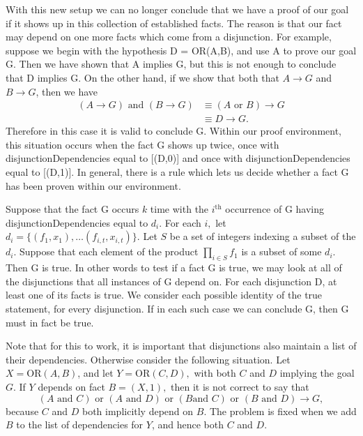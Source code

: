 \documentclass[11pt,
oneside]{article} %
\begin{document}
With this new setup we can no longer conclude that we have a proof of
our goal if it shows up in this collection of established facts.  The
reason is that our fact may depend on one more facts which come from a
disjunction.  For example, suppose we begin with the hypothesis D =
OR(A,B), and use A to prove our goal G.  Then we have shown that A
implies G, but this is not enough to conclude that D implies G.  On
the other hand, if we show that both that $A\longrightarrow G$ and
$B\longrightarrow G$, then we have
\begin{align*}
(A\longrightarrow G) \text{ and } (B \longrightarrow G) &\equiv (A \text{ or } B) \longrightarrow G \\
&\equiv D \longrightarrow G.
\end{align*} Therefore in this case it is valid to conclude G. Within our proof environment, this situation occurs when the fact G shows up twice, once with disjunctionDependencies equal to [(D,0)] and once with disjunctionDependencies equal to [(D,1)].  In general, there is a rule which lets us decide whether a fact G has been proven within our environment.

Suppose that the fact G occurs $k$ time with the $i^{\text{th}}$
occurrence of G having disjunctionDependencies equal to $d_i.$ For
each $i,$ let $d_i = \{(f_1,x_1), \ldots (f_{i,t}, x_{i,t})\}.$ Let
$S$ be a set of integers indexing a subset of the $d_i$. Suppose that
each element of the product $\prod_{i\in S} f_1$ is a subset of some
$d_i$.  Then G is true.  In other words to test if a fact G is true,
we may look at all of the disjunctions that all instances of G depend
on.  For each disjunction D, at least one of its facts is true.  We
consider each possible identity of the true statement, for every
disjunction.  If in each such case we can conclude G, then G must in
fact be true.

Note that for this to work, it is important that disjunctions also
maintain a list of their dependencies.  Otherwise consider the
following situation.  Let $X = \text{OR}(A,B)$, and let
$Y = \text{OR}(C,D),$ with both $C$ and $D$ implying the goal $G$.  If
$Y$ depends on fact $B = (X,1),$ then it is not correct to say
that
$$(A \text{ and } C)\text{ or }(A \text{ and } D)\text{ or }(B \text{
  and } C)\text{ or }(B \text{ and } D) \longrightarrow G,$$ because
$C$ and $D$ both implicitly depend on $B$.  The problem is fixed when
we add $B$ to the list of dependencies for $Y$, and hence both $C$ and
$D$.
\end{document}
